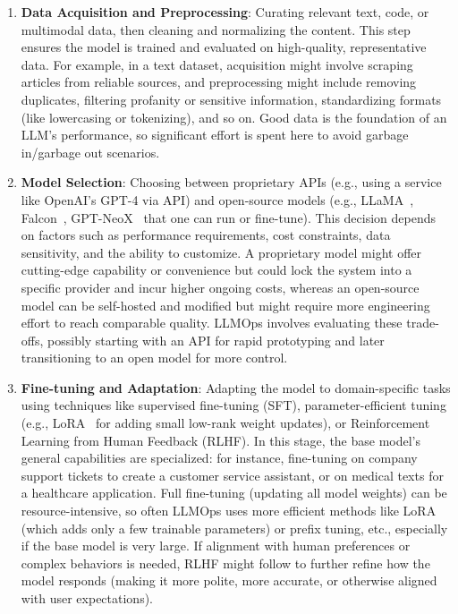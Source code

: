 \begin{enumerate}
\item \textbf{Data Acquisition and Preprocessing}: Curating relevant text, code, or multimodal data, then cleaning and normalizing the content. This step ensures the model is trained and evaluated on high-quality, representative data. For example, in a text dataset, acquisition might involve scraping articles from reliable sources, and preprocessing might include removing duplicates, filtering profanity or sensitive information, standardizing formats (like lowercasing or tokenizing), and so on. Good data is the foundation of an LLM’s performance, so significant effort is spent here to avoid garbage in/garbage out scenarios.
    \item \textbf{Model Selection}: Choosing between proprietary APIs (e.g., using a service like OpenAI’s GPT-4 via API) and open-source models (e.g., LLaMA~\cite{touvron2023llama}, Falcon~\cite{alabdulmohsin2023falcon}, GPT-NeoX~\cite{black2022gptneox} that one can run or fine-tune). This decision depends on factors such as performance requirements, cost constraints, data sensitivity, and the ability to customize. A proprietary model might offer cutting-edge capability or convenience but could lock the system into a specific provider and incur higher ongoing costs, whereas an open-source model can be self-hosted and modified but might require more engineering effort to reach comparable quality. LLMOps involves evaluating these trade-offs, possibly starting with an API for rapid prototyping and later transitioning to an open model for more control.

\item \textbf{Fine-tuning and Adaptation}: Adapting the model to domain-specific tasks using techniques like supervised fine-tuning (SFT), parameter-efficient tuning (e.g., LoRA~\cite{Hu2022LoRA} for adding small low-rank weight updates), or Reinforcement Learning from Human Feedback (RLHF). In this stage, the base model’s general capabilities are specialized: for instance, fine-tuning on company support tickets to create a customer service assistant, or on medical texts for a healthcare application. Full fine-tuning (updating all model weights) can be resource-intensive, so often LLMOps uses more efficient methods like LoRA (which adds only a few trainable parameters) or prefix tuning, etc., especially if the base model is very large. If alignment with human preferences or complex behaviors is needed, RLHF might follow to further refine how the model responds (making it more polite, more accurate, or otherwise aligned with user expectations).


\end{enumerate}
